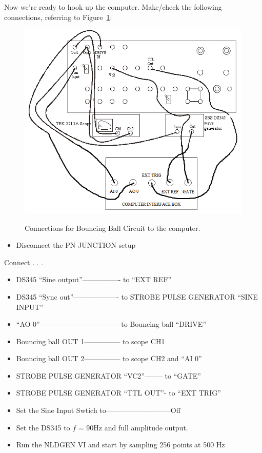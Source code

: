 \documentclass{../lab}
\begin{document}
Now we're ready to hook up the computer. Make/check the following connections, referring to Figure~\ref{fig:ConnectionsForBouncingBallCircuitToComputer}:

\begin{figure}[h]
    \centering
    \href{http://experimentationlab.berkeley.edu/sites/default/files/images/NLD_BALL_DIAGRAM.png}{\includegraphics[width=0.5\linewidth]{images/NLD_BALL_DIAGRAM.png}}
    \caption{Connections for Bouncing Ball Circuit to the computer.}
    \label{fig:ConnectionsForBouncingBallCircuitToComputer}
\end{figure}

\begin{itemize}
    \item Disconnect the PN-JUNCTION setup

\end{itemize}

Connect . . .

\begin{itemize}
    \item DS345 ``Sine output''---------------- to ``EXT REF''

    \item DS345 ``Sync out''------------------- to STROBE PULSE GENERATOR ``SINE INPUT''

    \item ``AO 0''--------------------------------- to Bouncing ball ``DRIVE''

    \item Bouncing ball OUT 1--------------- to scope CH1

    \item Bouncing ball OUT 2--------------- to scope CH2 and ``AI 0''

    \item STROBE PULSE GENERATOR ``VC2''-------- to ``GATE''

    \item STROBE PULSE GENERATOR ``TTL OUT''- to ``EXT TRIG''

    \item Set the Sine Input Swtich to---------------------------Off

    \item Set the DS345 to $f$ = 90Hz and full amplitude output.

    \item Run the NLDGEN VI and start by sampling 256 points at 500 Hz
\end{itemize}
\end{document}
